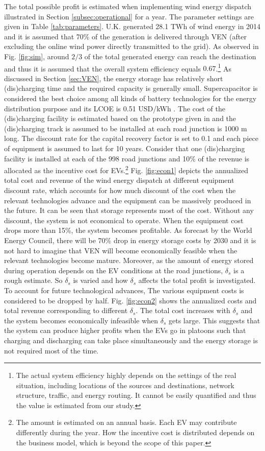 \documentclass[journal]{IEEEtran}
\begin{document}
The total possible profit is estimated when implementing wind energy dispatch illustrated in Section \ref{subsec:operational} for a year. The parameter settings are given in Table \ref{tab:parameters}. U.K. generated 28.1 TWh of wind energy in 2014 \cite{UKWind} and it is assumed that 70\% of the generation is delivered through VEN (after excluding the online wind power directly transmitted to the grid). As observed in Fig. \ref{fig:sim}, around $2/3$ of the total generated energy can reach the destination and thus it is assumed that the overall system efficiency equals $0.67$.\footnote{The actual system efficiency highly depends on the settings of the real situation, including locations of the sources and destinations, network structure, traffic, and energy routing. It cannot be easily quantified and thus the value is estimated from our study.} 
As discussed in Section \ref{sec:VEN}, the energy storage has relatively short (dis)charging time and the required capacity is generally small. Supercapacitor is considered the best choice among all kinds of battery technologies for the energy distribution purpose and its LCOE is 0.51 USD/kWh \cite{storagecost}. The cost of the (dis)charging facility is estimated based on the prototype given in \cite{EconDCEV} and the (dis)charging track is assumed to be installed at each road junction is 1000 m long. The discount rate for the capital recovery factor is set to 0.1 and each piece of equipment is assumed to last for 10 years. Consider that one (dis)charging facility is installed at each of the 998 road junctions and 10\% of the revenue is allocated as the incentive cost for EVs.\footnote{The amount is estimated on an annual basis. Each EV may contribute differently during the year. How the incentive cost is distributed depends on the business model, which is beyond the scope of this paper.} Fig. \ref{fig:econ1} depicts the annualized total cost and revenue of the wind energy dispatch at different equipment discount rate, which accounts for how much discount of the cost when the relevant technologies advance and the equipment can be massively produced in the future. It can be seen that storage represents most of the cost. Without any discount, the system is not economical to operate. When the equipment cost drops more than 15\%, the system becomes profitable. 
As forecast by the World Energy Council, there will be 70\% drop in energy storage costs by 2030 \cite{worldenergy} and it is not hard to imagine that VEN will become economically feasible when the relevant technologies become mature.
Moreover, as the amount of energy stored during operation depends on the EV conditions at the road junctions, $\delta_s$ is a rough estimate. So $\delta_s$ is varied and  how $\delta_s$ affects the total profit is investigated. To account for future technological advances, The various equipment costs is considered to be dropped by half. Fig. \ref{fig:econ2} shows the annualized costs and total revenue corresponding to different $\delta_s$. The total cost increases with $\delta_s$ and the system becomes economically infeasible when $\delta_s$ gets large. This suggests that the system can produce higher profits when the EVs go in platoons such that charging and discharging can take place simultaneously and the energy storage is not required most of the time.
\end{document}
